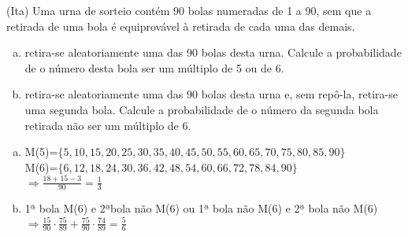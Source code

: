 \begin{ex}
(Ita) Uma urna de sorteio contém 90 bolas numeradas de 1 a 90, sem que a retirada de uma bola é equiprovável à retirada de cada uma das demais.
   \begin{enumerate}[(a)]
   \item retira-se aleatoriamente uma das 90 bolas desta urna. Calcule a probabilidade de o número desta bola ser um múltiplo de 5 ou de 6.
   \item retira-se aleatoriamente uma das 90 bolas desta urna e, sem repô-la, retira-se uma segunda bola. Calcule a probabilidade de o número da segunda bola retirada não ser um múltiplo de 6.
   \end{enumerate}
     \begin{sol}
      \phantom{A}
       \begin{enumerate} [(a)]
           \item M(5)=$\{5,10,15,20,25,30,35,40,45,50,55,60,65,70,75,80,85,90\}$\\
           M(6)=$\{6,12,18,24,30,36,42,48,54,60,66,72,78,84,90\}$\\
           $\Longrightarrow \frac{18+15-3}{90}=\frac{1}{3}$
           \item 1ª bola M(6) e 2ªbola não M(6) ou 1ª bola não M(6) e 2ª bola não M(6) \\
           $\Longrightarrow \frac{15}{90}\cdot\frac{75}{89}+\frac{75}{90}\cdot\frac{74}{89}=\frac{5}{6}$
       \end{enumerate}
     \end{sol}
\end{ex}